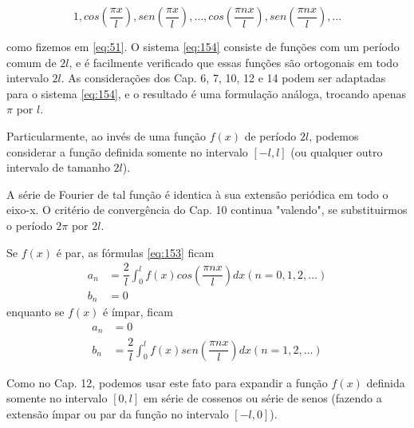 \begin{equation}
\label{eq:154}
    1, cos\left(\dfrac{\pi x}{l}\right), sen\left(\dfrac{\pi x}{l}\right), \ldots, cos\left(\dfrac{\pi nx}{l}\right), sen\left(\dfrac{\pi nx}{l}\right), \ldots
\end{equation} 

como fizemos em \ref{eq:51}. O sistema \ref{eq:154} consiste de funções com um período comum
de $2l$, e é facilmente verificado que essas funções são ortogonais em todo intervalo $2l$.
As considerações dos Cap. 6, 7, 10, 12 e 14 podem ser adaptadas para o sistema \ref{eq:154},
e o resultado é uma formulação análoga, trocando apenas $\pi$ por $l$.

Particularmente, ao invés de uma função $f(x)$ de período $2l$, podemos considerar a 
função definida somente no intervalo $[-l, l]$ (ou qualquer outro intervalo de tamanho $2l$).

A série de Fourier de tal função é identica à sua extensão periódica em todo o eixo-x. O
critério de convergência do Cap. 10 continua "valendo", se substituirmos o período $2\pi$ por
$2l$.

Se $f(x)$ é par, as fórmulas \ref{eq:153} ficam
\begin{equation}
\label{eq:155}
    \begin{split}
        a_n &= \dfrac{2}{l}\int_{0}^{l}f(x)cos\left(\dfrac{\pi nx}{l}\right)dx (n = 0, 1, 2, \ldots)\\
        b_n &= 0
    \end{split}
\end{equation}
enquanto se $f(x)$ é ímpar, ficam
\begin{equation}
\label{eq:156}
    \begin{split}
        a_n &= 0\\
        b_n &= \dfrac{2}{l}\int_{0}^{l}f(x)sen\left(\dfrac{\pi nx}{l}\right)dx (n = 1, 2, \ldots)
    \end{split}
\end{equation}

Como no Cap. 12, podemos usar este fato para expandir a função $f(x)$ definida somente no
intervalo $[0, l]$ em série de cossenos ou série de senos (fazendo a extensão ímpar ou par
da função no intervalo $[-l, 0]$).\\

